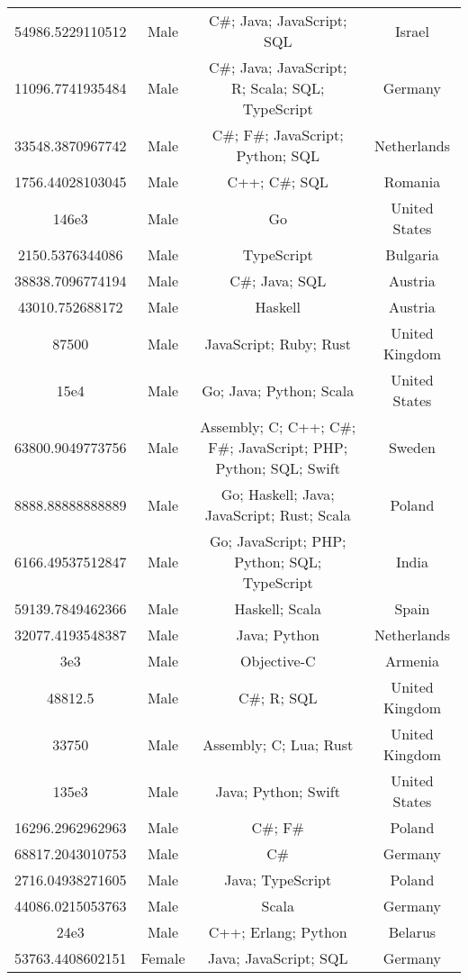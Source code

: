 \begin{center}
\begin{tabular}{ |c|c|c|c| }
54986.5229110512  &  Male  &  C\#; Java; JavaScript; SQL  &  Israel  \\ 
11096.7741935484  &  Male  &  C\#; Java; JavaScript; R; Scala; SQL; TypeScript  &  Germany  \\ 
33548.3870967742  &  Male  &  C\#; F\#; JavaScript; Python; SQL  &  Netherlands  \\ 
1756.44028103045  &  Male  &  C++; C\#; SQL  &  Romania  \\ 
146e3  &  Male  &  Go  &  United States  \\ 
2150.5376344086  &  Male  &  TypeScript  &  Bulgaria  \\ 
38838.7096774194  &  Male  &  C\#; Java; SQL  &  Austria  \\ 
43010.752688172  &  Male  &  Haskell  &  Austria  \\ 
87500  &  Male  &  JavaScript; Ruby; Rust  &  United Kingdom  \\ 
15e4  &  Male  &  Go; Java; Python; Scala  &  United States  \\ 
63800.9049773756  &  Male  &  Assembly; C; C++; C\#; F\#; JavaScript; PHP; Python; SQL; Swift  &  Sweden  \\ 
8888.88888888889  &  Male  &  Go; Haskell; Java; JavaScript; Rust; Scala  &  Poland  \\ 
6166.49537512847  &  Male  &  Go; JavaScript; PHP; Python; SQL; TypeScript  &  India  \\ 
59139.7849462366  &  Male  &  Haskell; Scala  &  Spain  \\ 
32077.4193548387  &  Male  &  Java; Python  &  Netherlands  \\ 
3e3  &  Male  &  Objective-C  &  Armenia  \\ 
48812.5  &  Male  &  C\#; R; SQL  &  United Kingdom  \\ 
33750  &  Male  &  Assembly; C; Lua; Rust  &  United Kingdom  \\ 
135e3  &  Male  &  Java; Python; Swift  &  United States  \\ 
16296.2962962963  &  Male  &  C\#; F\#  &  Poland  \\ 
68817.2043010753  &  Male  &  C\#  &  Germany  \\ 
2716.04938271605  &  Male  &  Java; TypeScript  &  Poland  \\ 
44086.0215053763  &  Male  &  Scala  &  Germany  \\ 
24e3  &  Male  &  C++; Erlang; Python  &  Belarus  \\ 
53763.4408602151  &  Female  &  Java; JavaScript; SQL  &  Germany  \\ 

\end{tabular}
\end{center}
